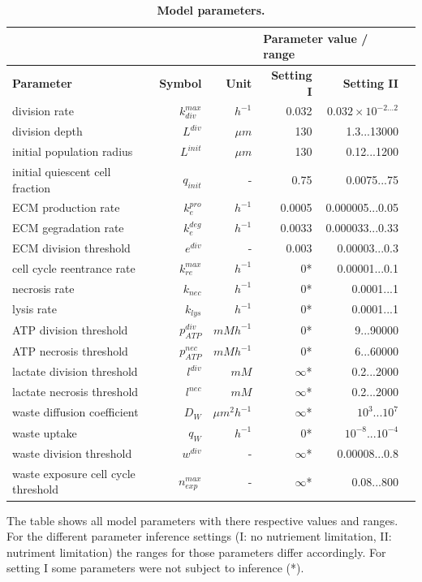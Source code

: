 \documentclass[10pt,letterpaper]{article}
\newcommand{\sI}[1]{{\color{red}#1}}
\newcommand{\sII}[1]{{\color{blue}#1}}
\begin{document}
\begin{table}[!ht]
\begin{adjustwidth}{-0in}{0in} %
\caption{
{\bf Model parameters.}}
\begin{tabular}{|l|r|r|r|r|r|}
\hline
\multicolumn{3}{|l|}{\bf } & \multicolumn{2}{|l|}{\bf Parameter value / range}\\ \hline
{\bf Parameter} 					&{\bf Symbol} &{\bf Unit} &\sI{\bf Setting I} &\sII{\bf Setting II}\\ \hline
division rate 					&$k_{div}^{max}$ & $h^{-1}$ & 0.032 & $0.032 \times 10^{-2...2}$\\ \hline
division depth 					&$L^{div}$ & $\mu m$ & 130 & 1.3...13000\\ \hline
initial population radius 			&$L^{init}$ & $\mu m$ & 130 & 0.12...1200\\ \hline
initial quiescent cell fraction 		& $q_{init}$ &-& 0.75& 0.0075...75\\ \hline
ECM production rate 			&$k_{e}^{pro}$  & $h^{-1}$&0.0005 &0.000005...0.05\\ \hline
ECM gegradation rate 			&$k_{e}^{deg}$ &$h^{-1}$&0.0033 &0.000033...0.33\\ \hline
ECM division threshold 			&$e^{div}$ &- &0.003 &0.00003...0.3\\ \hline
\hline
cell cycle reentrance rate 			&$k^{max}_{re}$ &$h^{-1}$ &0*&0.00001...0.1\\ \hline
necrosis rate 					&$k_{nec}$ &$h^{-1}$&0*&0.0001...1\\ \hline
lysis rate 						&$k_{lys}$ &$h^{-1}$&0*&0.0001...1\\ \hline
ATP division threshold 			&$p^{div}_{ATP}$ &$mM h^{-1}$& 0*& 9...90000\\ \hline
ATP necrosis threshold 			&$p^{nec}_{ATP}$&$mM h^{-1}$& 0*& 6...60000\\ \hline
lactate division threshold 			&$l^{div}$  &$mM$&$\infty$* & 0.2...2000\\ \hline
lactate necrosis threshold 			&$l^{nec}$ &$mM$ &$\infty$* & 0.2...2000\\ \hline
waste diffusion coefficient 			&$D_W$& $\mu m^{2} h^{-1}$  &$\infty$*& $10^{3}...10^{7}$\\ \hline
waste uptake					& $q_W$ &$h^{-1}$ &$0$*& $10^{-8}...10^{-4}$\\ \hline
waste division threshold 			&$w^{div}$ &- &$\infty$*&0.00008...0.8\\ \hline
waste exposure cell cycle threshold 	&$n^{max}_{exp}$&-& $\infty$*& 0.08...800\\ \hline
\end{tabular}
\begin{flushleft} The table shows all model parameters with there respective values and ranges. For the different parameter inference settings (I: no nutriement limitation, II: nutriment limitation) the ranges for those parameters differ accordingly. For setting I some parameters were not subject to inference (*).
\end{flushleft}
\label{tab:model-parameters}
\end{adjustwidth}
\end{table}
\end{document}
